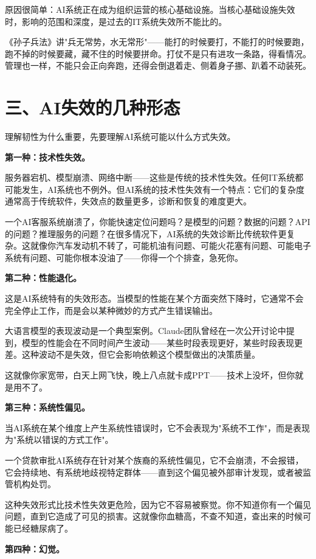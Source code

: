原因很简单：AI系统正在成为组织运营的核心基础设施。当核心基础设施失效时，影响的范围和深度，是过去的IT系统失效所不能比的。

《孙子兵法》讲"兵无常势，水无常形"——能打的时候要打，不能打的时候要跑，跑不掉的时候要藏，藏不住的时候要拼命。打仗不是只有进攻一条路，得看情况。管理也一样，不能只会正向奔跑，还得会倒退着走、侧着身子挪、趴着不动装死。

\section{三、AI失效的几种形态}


理解韧性为什么重要，先要理解AI系统可能以什么方式失效。

\textbf{第一种：技术性失效。}

服务器宕机、模型崩溃、网络中断——这些是传统的技术性失效。任何IT系统都可能发生，AI系统也不例外。但AI系统的技术性失效有一个特点：它们的复杂度通常高于传统软件，失效点的数量更多，诊断和恢复的难度更大。

一个AI客服系统崩溃了，你能快速定位问题吗？是模型的问题？数据的问题？API的问题？推理服务的问题？在很多情况下，AI系统的失效诊断比传统软件更复杂。这就像你汽车发动机不转了，可能机油有问题、可能火花塞有问题、可能电子系统有问题、可能你根本没油了——你得一个个排查，急死你。

\textbf{第二种：性能退化。}

这是AI系统特有的失效形态。当模型的性能在某个方面突然下降时，它通常不会完全停止工作，而是会以某种微妙的方式产生错误输出。

大语言模型的表现波动是一个典型案例。Claude团队曾经在一次公开讨论中提到，模型的性能会在不同时间产生波动——某些时段表现更好，某些时段表现更差。这种波动不是失效，但它会影响依赖这个模型做出的决策质量。

这就像你家宽带，白天上网飞快，晚上八点就卡成PPT——技术上没坏，但你就是用不了。

\textbf{第三种：系统性偏见。}

当AI系统在某个维度上产生系统性错误时，它不会表现为"系统不工作"，而是表现为"系统以错误的方式工作"。

一个贷款审批AI系统存在针对某个族裔的系统性偏见，它不会崩溃，不会报错，它会持续地、有系统地歧视特定群体——直到这个偏见被外部审计发现，或者被监管机构处罚。

这种失效形式比技术性失效更危险，因为它不容易被察觉。你不知道你有一个偏见问题，直到它造成了可见的损害。这就像你血糖高，不查不知道，查出来的时候可能已经糖尿病了。

\textbf{第四种：幻觉。}

